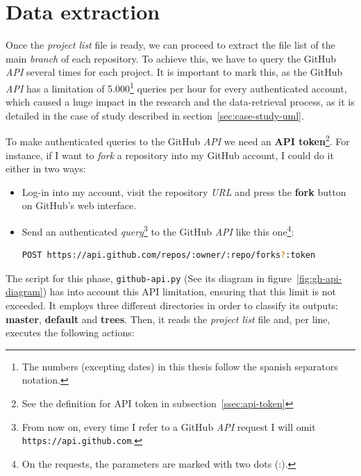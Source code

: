 \documentclass[a4paper, 12pt]{book}
\begin{document}
\section{Data extraction}
Once the \emph{project list} file is ready, we can proceed to extract the file list of the main \textit{branch} of each
repository. To achieve this, we have to query the GitHub \textit{API} several times for each project.
It is important to mark this, as the GitHub \textit{API} has a limitation of
5.000\footnote{The numbers (excepting dates) in this thesis follow the spanish separators notation.}
queries per hour for every authenticated account, which caused a huge impact in the research and the data-retrieval
process, as it is detailed in the case of study described in section~\ref{sec:case-study-uml}.\par
To make authenticated queries to the GitHub \textit{API} we need an \textbf{API token}\footnote{See the definition for API token in subsection~\ref{ssec:api-token}}.
For instance, if I want to \textit{fork} a repository into my GitHub account, I could do it either in two ways:
\begin{itemize}
  \item Log-in into my account, visit the repository \emph{URL} and press the \textbf{fork} button on GitHub's web interface.
  \item Send an authenticated \textit{query}\footnote{From now on, every time I refer to a GitHub \textit{API}
  request I will omit \texttt{https://api.github.com}.}
  to the GitHub \textit{API} like this one\footnote{On the requests, the parameters are marked with two dots (:).}:
  \begin{lstlisting}[language=bash]
  POST https://api.github.com/repos/:owner/:repo/forks?:token \end{lstlisting}
\end{itemize}
The script for this phase, \texttt{github-api.py} (See its diagram in figure~\ref{fig:gh-api-diagram}) has into account
this API limitation, ensuring that this limit is not exceeded. It employs three different directories in order to classify its outputs:
\textbf{master}, \textbf{default} and \textbf{trees}.
Then, it reads the \emph{project list} file and, per line, executes the following actions:
\end{document}
